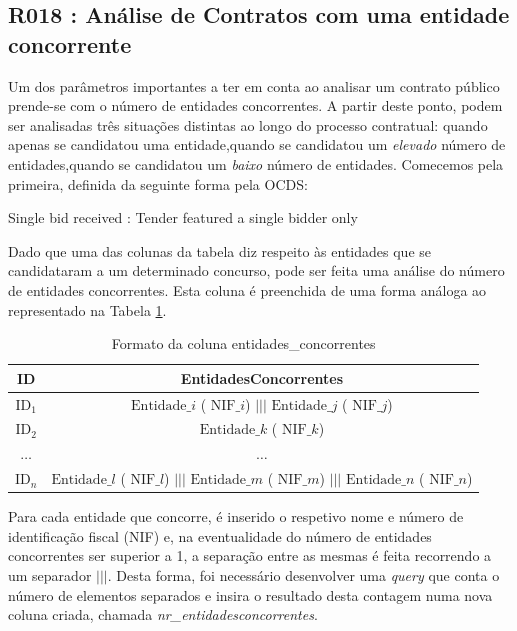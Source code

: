 \subsection{R018 : Análise de Contratos com uma entidade concorrente}

Um dos parâmetros importantes a ter em conta ao analisar um contrato público prende-se com o número de entidades concorrentes. A partir deste ponto, podem ser analisadas três situações distintas ao longo do processo contratual: 
quando apenas se candidatou uma entidade,quando se candidatou um \textit{elevado} número de entidades,quando se candidatou um \textit{baixo} número de entidades. Comecemos pela primeira, definida da seguinte forma pela OCDS:

{Single bid received : Tender featured a single bidder only }


Dado que uma das colunas da tabela diz respeito às entidades que se candidataram a um determinado concurso, pode ser feita uma análise do número de entidades concorrentes. Esta coluna é preenchida de uma forma análoga ao representado na Tabela \ref{tab:entsconc}. 


\begin{table}[H]
	\centering
	\begin{tabular}{|c|c|}
		\hline
		\textbf{ID}   & \textbf{EntidadesConcorrentes}                                                                                                      \\ \hline
		$\text{ID}_1$ & $\text{Entidade}\_i$ ( $\text{NIF}\_i$) $|||$ $\text{Entidade}\_j$ ( $\text{NIF}\_j$)                                               \\ \hline
		$\text{ID}_2$ & $\text{Entidade}\_k$ ( $\text{NIF}\_k$)                                                                                             \\ \hline
		$\dots$       & $\dots$                                                                                                                             \\ \hline
		$\text{ID}_n$ & $\text{Entidade}\_l$ ( $\text{NIF}\_l$) $|||$ $\text{Entidade}\_m$ ( $\text{NIF}\_m$) $|||$ $\text{Entidade}\_n$ ( $\text{NIF}\_n$) \\ \hline
	\end{tabular}
	\caption{Formato da coluna entidades\_concorrentes}
	\label{tab:entsconc}
\end{table}

Para cada entidade que concorre, é inserido o respetivo nome e número de identificação fiscal (NIF) e, na eventualidade do número de entidades concorrentes ser superior a 1, a separação entre as mesmas é feita recorrendo a um separador $|||$. Desta forma, foi necessário desenvolver uma \textit{query} que conta o número de elementos separados e insira o resultado desta contagem numa nova coluna criada, chamada \textit{nr\_entidadesconcorrentes}.


